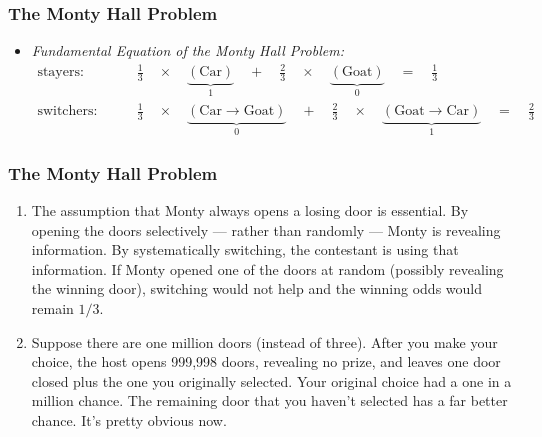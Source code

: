 \begin{frame}
\frametitle{The Monty Hall Problem}
\begin{itemize}
\item \emph{Fundamental Equation of the Monty Hall Problem:}
\begin{align*}
\text{stayers:} & \qquad
\frac{1}{3} \quad \times \quad
    \underbrace{(\text{Car})}_{1}
  \quad+\quad 
\frac{2}{3} \quad \times \quad
    \underbrace{(\text{Goat})}_{0}
  \quad=\quad \frac{1}{3} \\
\text{switchers:} & \qquad
\frac{1}{3} \quad \times \quad
    \underbrace{(\text{Car}\to\text{Goat})}_{0}
  \quad+\quad 
\frac{2}{3} \quad \times \quad
    \underbrace{(\text{Goat}\to\text{Car})}_{1}
  \quad=\quad \frac{2}{3}
\end{align*}
\end{itemize}
\end{frame}


\begin{frame}
\frametitle{The Monty Hall Problem}
\begin{enumerate}
\item The assumption that Monty always opens a losing door is essential. By opening the doors selectively --- rather than randomly --- Monty is revealing information. By systematically switching, the contestant is using that information. If Monty opened one of the doors at random (possibly revealing the winning door), switching would not help and the winning odds would remain $1/3$.
\item Suppose there are one million doors (instead of three). After you make your choice, the host opens 999,998 doors, revealing no prize, and leaves one door closed plus the one you originally selected. Your original choice had a one in a million chance. The remaining door that you haven't selected has a far better chance. It's pretty obvious now.
\end{enumerate}
\end{frame}



